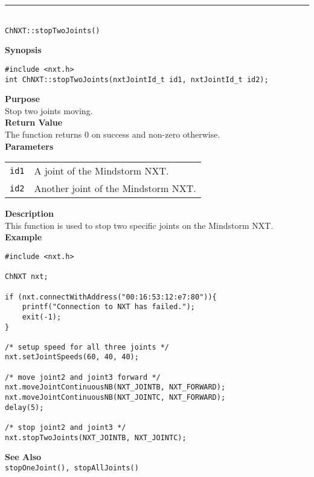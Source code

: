 \noindent
\vspace{5pt}
\rule{4.5in}{0.015in}\\
\noindent
{\LARGE \texttt{ChNXT::stopTwoJoints()} }\\


\noindent
{\bf Synopsis}
\begin{lstlisting}
#include <nxt.h>
int ChNXT::stopTwoJoints(nxtJointId_t id1, nxtJointId_t id2);
\end{lstlisting}

\noindent
{\bf Purpose}\\
Stop two joints moving.\\

\noindent
{\bf Return Value}\\
The function returns 0 on success and non-zero otherwise.\\

\noindent
{\bf Parameters}\\
\vspace{-0.1in}
\begin{description}
\item
\begin{tabular}{ p{20mm}p{135mm} }
\texttt{id1}       &A joint of the Mindstorm NXT.\\
\texttt{id2}      &Another joint of the Mindstorm NXT.\\
\end{tabular}
\end{description}

\noindent
{\bf Description}\\
This function is used to stop two specific joints on the Mindstorm NXT.\\

\noindent
{\bf Example}
\begin{lstlisting}
#include <nxt.h> 

ChNXT nxt;

if (nxt.connectWithAddress("00:16:53:12:e7:80")){
    printf("Connection to NXT has failed.");
    exit(-1);
}
    
/* setup speed for all three joints */
nxt.setJointSpeeds(60, 40, 40);

/* move joint2 and joint3 forward */
nxt.moveJointContinuousNB(NXT_JOINTB, NXT_FORWARD);
nxt.moveJointContinuousNB(NXT_JOINTC, NXT_FORWARD);
delay(5);

/* stop joint2 and joint3 */
nxt.stopTwoJoints(NXT_JOINTB, NXT_JOINTC);
\end{lstlisting}

\noindent
{\bf See Also}\\
\texttt{stopOneJoint(), stopAllJoints()}\\
